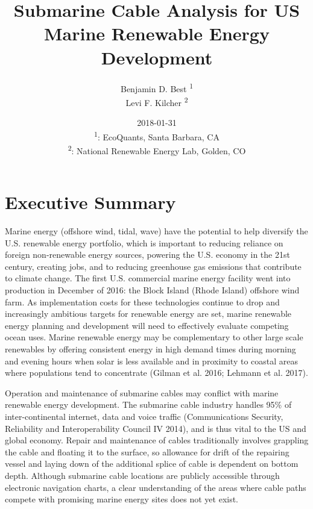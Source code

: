 \documentclass[]{article}
\title{Submarine Cable Analysis for US Marine Renewable Energy Development}
\author{Benjamin D. Best \textsuperscript{1} \\ Levi F. Kilcher \textsuperscript{2}}
\date{2018-01-31\\
\textsuperscript{1}: EcoQuants, Santa Barbara, CA\\
\textsuperscript{2}: National Renewable Energy Lab, Golden, CO \newline}
\begin{document}
\maketitle

{
\setcounter{tocdepth}{4}
\tableofcontents
}
\listoffigures
\hypertarget{executive-summary}{%
\section*{Executive Summary}\label{executive-summary}}

Marine energy (offshore wind, tidal, wave) have the potential to help
diversify the U.S. renewable energy portfolio, which is important to
reducing reliance on foreign non-renewable energy sources, powering the
U.S. economy in the 21st century, creating jobs, and to reducing
greenhouse gas emissions that contribute to climate change. The first
U.S. commercial marine energy facility went into production in December
of 2016: the Block Island (Rhode Island) offshore wind farm. As
implementation costs for these technologies continue to drop and
increasingly ambitious targets for renewable energy are set, marine
renewable energy planning and development will need to effectively
evaluate competing ocean uses. Marine renewable energy may be
complementary to other large scale renewables by offering consistent
energy in high demand times during morning and evening hours when solar
is less available and in proximity to coastal areas where populations
tend to concentrate (Gilman et al. 2016; Lehmann et al. 2017).

Operation and maintenance of submarine cables may conflict with marine
renewable energy development. The submarine cable industry handles 95\%
of inter-continental internet, data and voice traffic (Communications
Security, Reliability and Interoperability Council IV 2014), and is thus
vital to the US and global economy. Repair and maintenance of cables
traditionally involves grappling the cable and floating it to the
surface, so allowance for drift of the repairing vessel and laying down
of the additional splice of cable is dependent on bottom depth. Although
submarine cable locations are publicly accessible through electronic
navigation charts, a clear understanding of the areas where cable paths
compete with promising marine energy sites does not yet exist.
\end{document}
